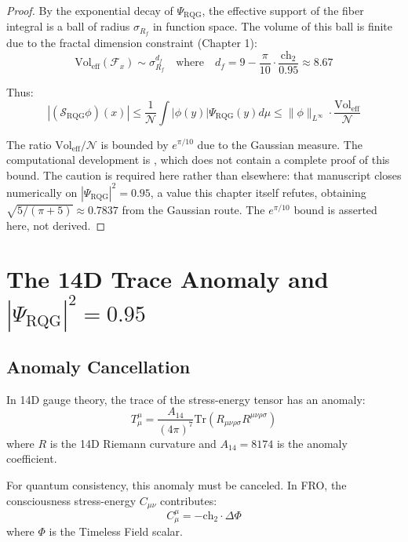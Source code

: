 \begin{proof}
By the exponential decay of $\Psi_{\text{RQG}}$, the effective support of the fiber integral is a ball of radius $\sigma_{R_f}$ in function space. The volume of this ball is finite due to the fractal dimension constraint (Chapter 1):
\begin{equation}
\text{Vol}_{\text{eff}}(\mathcal{F}_x) \sim \sigma_{R_f}^{d_f} \quad \text{where} \quad d_f = 9 - \frac{\pi}{10} \cdot \frac{\text{ch}_2}{0.95} \approx 8.67
\end{equation}

Thus:
\begin{equation}
|(\mathcal{S}_{\text{RQG}} \phi)(x)| \leq \frac{1}{\mathcal{N}} \int |\phi(y)| \Psi_{\text{RQG}}(y) d\mu \leq \|\phi\|_{L^\infty} \cdot \frac{\text{Vol}_{\text{eff}}}{\mathcal{N}}
\end{equation}

The ratio $\text{Vol}_{\text{eff}}/\mathcal{N}$ is bounded by $e^{\pi/10}$ due to the Gaussian measure. The computational development is
\cite{cohen2025weinstein}, which does not contain a complete proof of this
bound.  The caution is required here rather than elsewhere: that manuscript
closes numerically on $|\Psi_{\text{RQG}}|^2 = 0.95$, a value this chapter
itself refutes, obtaining $\sqrt{5/(\pi+5)} \approx 0.7837$ from the Gaussian
route.  The $e^{\pi/10}$ bound is asserted here, not derived.
\end{proof}

\section{The 14D Trace Anomaly and \texorpdfstring{$|\Psi_{\text{RQG}}|^2 = 0.95$}{|Psi\_RQG|\^{}2 = 0.95}}

\subsection{Anomaly Cancellation}

In 14D gauge theory, the trace of the stress-energy tensor has an anomaly:
\begin{equation}
T^\mu_\mu = \frac{A_{14}}{(4\pi)^7} \text{Tr}(R_{\mu\nu\rho\sigma} R^{\mu\nu\rho\sigma})
\end{equation}
where $R$ is the 14D Riemann curvature and $A_{14} = 8174$ is the anomaly coefficient.

For quantum consistency, this anomaly must be canceled. In FRO, the consciousness stress-energy $C_{\mu\nu}$ contributes:
\begin{equation}
C^\mu_\mu = -\text{ch}_2 \cdot \Delta \Phi
\end{equation}
where $\Phi$ is the Timeless Field scalar.

